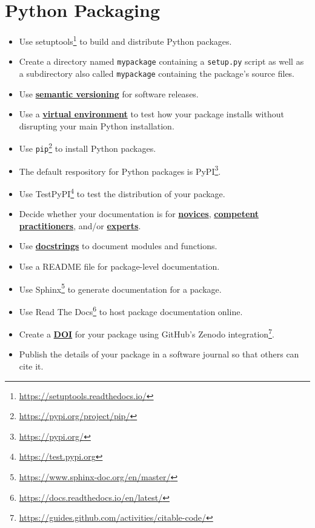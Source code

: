 \documentclass[
]{krantz}
\providecommand{\tightlist}{%
  \setlength{\itemsep}{0pt}\setlength{\parskip}{0pt}}
\renewcommand{\href}[2]{#2\footnote{\url{#1}}}
\newcommand{\gref}[2]{\hyperlink{#2}{\textbf{#1}}}
\begin{document}
\hypertarget{python-packaging-1}{%
\section{Python Packaging}\label{python-packaging-1}}

\begin{itemize}
\tightlist
\item
  Use \href{https://setuptools.readthedocs.io/}{setuptools} to build and distribute Python packages.
\item
  Create a directory named \texttt{mypackage} containing a \texttt{setup.py} script
  as well as a subdirectory also called \texttt{mypackage} containing the package's source files.
\item
  Use \gref{semantic versioning}{semantic\_versioning} for software releases.
\item
  Use a \gref{virtual environment}{virtual\_environment} to test how your package installs
  without disrupting your main Python installation.\\
\item
  Use \href{https://pypi.org/project/pip/}{\texttt{pip}} to install Python packages.
\item
  The default respository for Python packages is \href{https://pypi.org/}{PyPI}.
\item
  Use \href{https://test.pypi.org}{TestPyPI} to test the distribution of your package.
\item
  Decide whether your documentation is for \gref{novices}{novice},
  \gref{competent practitioners}{competent\_practitioner}, and/or \gref{experts}{expert}.
\item
  Use \gref{docstrings}{docstring} to document modules and functions.
\item
  Use a README file for package-level documentation.
\item
  Use \href{https://www.sphinx-doc.org/en/master/}{Sphinx} to generate documentation for a package.
\item
  Use \href{https://docs.readthedocs.io/en/latest/}{Read The Docs} to host package documentation online.
\item
  Create a \gref{DOI}{doi} for your package using \href{https://guides.github.com/activities/citable-code/}{GitHub's Zenodo integration}.
\item
  Publish the details of your package in a software journal so that others can cite it.
\end{itemize}
\end{document}
